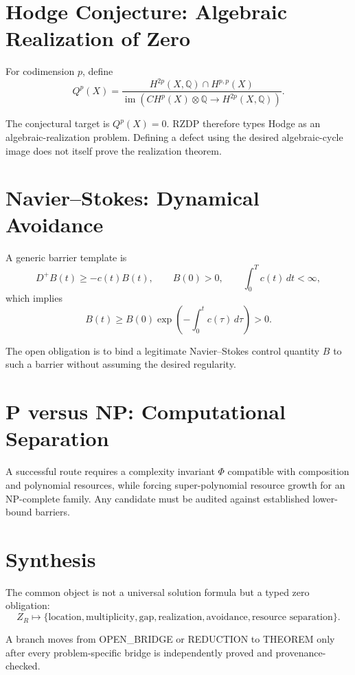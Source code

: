 \documentclass[11pt]{article}
\begin{document}
\section{Hodge Conjecture: Algebraic Realization of Zero}

For codimension \(p\), define
\[
Q^p(X)=
\frac{H^{2p}(X,\mathbb Q)\cap H^{p,p}(X)}
{\operatorname{im}(CH^p(X)\otimes\mathbb Q\to H^{2p}(X,\mathbb Q))}.
\]

The conjectural target is \(Q^p(X)=0\). RZDP therefore types Hodge as an algebraic-realization problem. Defining a defect using the desired algebraic-cycle image does not itself prove the realization theorem.

\section{Navier--Stokes: Dynamical Avoidance}

A generic barrier template is
\[
D^+B(t)\ge-c(t)B(t),\qquad B(0)>0,\qquad \int_0^T c(t)\,dt<\infty,
\]
which implies
\[
B(t)\ge B(0)\exp\!\left(-\int_0^t c(\tau)\,d\tau\right)>0.
\]

The open obligation is to bind a legitimate Navier--Stokes control quantity \(B\) to such a barrier without assuming the desired regularity.

\section{P versus NP: Computational Separation}

A successful route requires a complexity invariant \(\Phi\) compatible with composition and polynomial resources, while forcing super-polynomial resource growth for an NP-complete family. Any candidate must be audited against established lower-bound barriers.

\section{Synthesis}

The common object is not a universal solution formula but a typed zero obligation:
\[
Z_R\mapsto
\{\text{location},\text{multiplicity},\text{gap},\text{realization},\text{avoidance},\text{resource separation}\}.
\]

A branch moves from OPEN\_BRIDGE or REDUCTION to THEOREM only after every problem-specific bridge is independently proved and provenance-checked.



\end{document}
